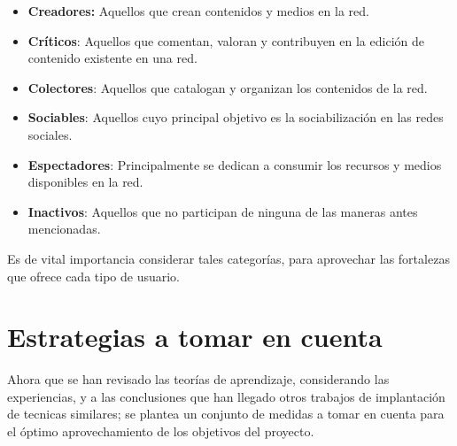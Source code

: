 \begin{itemize}
\item \textbf{Creadores:} Aquellos que crean contenidos y medios en la red.
\item \textbf{Críticos}: Aquellos que comentan, valoran y contribuyen en la
      edición de contenido existente en una red.
\item \textbf{Colectores}: Aquellos que catalogan y organizan los contenidos de
      la red.
\item \textbf{Sociables}: Aquellos cuyo principal objetivo es la sociabilización
      en las redes sociales.
\item \textbf{Espectadores}: Principalmente se dedican a consumir los recursos y
      medios disponibles en la red.
\item \textbf{Inactivos}: Aquellos que no participan de ninguna de las maneras
      antes mencionadas.
\end{itemize}

Es de vital importancia considerar tales categorías, para aprovechar las
fortalezas que ofrece cada tipo de usuario.

\section{Estrategias a tomar en cuenta}

Ahora que se han revisado las teorías de aprendizaje, considerando las
experiencias, y a las conclusiones que han llegado otros trabajos de implantación
de tecnicas similares\cite{Ontalba}; se plantea un conjunto de medidas a tomar
en cuenta para el óptimo aprovechamiento de los objetivos del proyecto.

